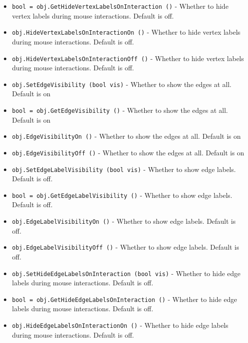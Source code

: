 \begin{itemize}
\item  \verb|bool = obj.GetHideVertexLabelsOnInteraction ()| -  Whether to hide vertex labels during mouse interactions.  Default is off.

\item  \verb|obj.HideVertexLabelsOnInteractionOn ()| -  Whether to hide vertex labels during mouse interactions.  Default is off.

\item  \verb|obj.HideVertexLabelsOnInteractionOff ()| -  Whether to hide vertex labels during mouse interactions.  Default is off.

\item  \verb|obj.SetEdgeVisibility (bool vis)| -  Whether to show the edges at all. Default is on

\item  \verb|bool = obj.GetEdgeVisibility ()| -  Whether to show the edges at all. Default is on

\item  \verb|obj.EdgeVisibilityOn ()| -  Whether to show the edges at all. Default is on

\item  \verb|obj.EdgeVisibilityOff ()| -  Whether to show the edges at all. Default is on

\item  \verb|obj.SetEdgeLabelVisibility (bool vis)| -  Whether to show edge labels.  Default is off.

\item  \verb|bool = obj.GetEdgeLabelVisibility ()| -  Whether to show edge labels.  Default is off.

\item  \verb|obj.EdgeLabelVisibilityOn ()| -  Whether to show edge labels.  Default is off.

\item  \verb|obj.EdgeLabelVisibilityOff ()| -  Whether to show edge labels.  Default is off.

\item  \verb|obj.SetHideEdgeLabelsOnInteraction (bool vis)| -  Whether to hide edge labels during mouse interactions.  Default is off.

\item  \verb|bool = obj.GetHideEdgeLabelsOnInteraction ()| -  Whether to hide edge labels during mouse interactions.  Default is off.

\item  \verb|obj.HideEdgeLabelsOnInteractionOn ()| -  Whether to hide edge labels during mouse interactions.  Default is off.


\end{itemize}
